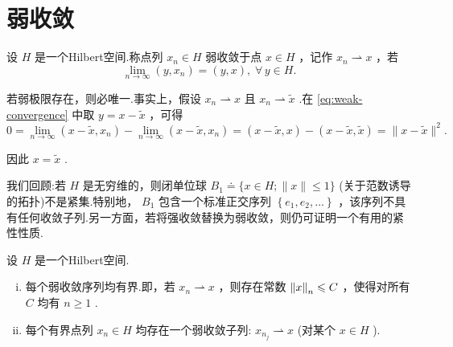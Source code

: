 \section{弱收敛}

\begin{definition}[弱收敛]\label{def:weak-convergence}
设 $H$ 是一个Hilbert空间.称点列 ${x}_{n} \in  H$ 弱收敛于点 $x \in  H$ ，记作 ${x}_{n} \rightharpoonup  x$ ，若
\begin{equation}\tag{5.24}\label{eq:weak-convergence}
\mathop{\lim }\limits_{{n \rightarrow  \infty }}\left( {y,{x}_{n}}\right)  = \left( {y,x}\right), \;\forall\,y \in  H.
\end{equation}
\end{definition}

若弱极限存在，则必唯一.事实上，假设 ${x}_{n} \rightharpoonup  x$ 且 ${x}_{n} \rightharpoonup  \widetilde{x}$ .在 \eqref{eq:weak-convergence} 中取 $y = x - \widetilde{x}$ ，可得
\[
0 = \mathop{\lim }\limits_{{n \rightarrow  \infty }}\left( {x - \widetilde{x},{x}_{n}}\right)  - \mathop{\lim }\limits_{{n \rightarrow  \infty }}\left( {x - \widetilde{x},{x}_{n}}\right)  = \left( {x - \widetilde{x},x}\right)  - \left( {x - \widetilde{x},\widetilde{x}}\right)  = \| x - \widetilde{x}{\| }^{2}.
\]

因此 $x = \widetilde{x}$ .

我们回顾:若 $H$ 是无穷维的，则闭单位球 ${B}_{1} \doteq  \{ x \in  H;\| x\|  \leq  1\}$ (关于范数诱导的拓扑)不是紧集.特别地， ${B}_{1}$ 包含一个标准正交序列 $\left\{  {{e}_{1},{e}_{2},\ldots }\right\}$ ，该序列不具有任何收敛子列.另一方面，若将强收敛替换为弱收敛，则仍可证明一个有用的紧性性质.

\begin{theorem}[弱收敛序列]\label{thm:weak-convergence-sequence}
设 $H$ 是一个Hilbert空间.
\begin{enumerate}[(i)]
    \item 每个弱收敛序列均有界.即，若 ${x}_{n} \rightharpoonup  x$ ，则存在常数 $\norm{x}_{n} \leqslant  C$ ，使得对所有 $C$ 均有 $n \geq  1$ .
    \item 每个有界点列 ${x}_{n} \in  H$ 均存在一个弱收敛子列: ${x}_{{n}_{j}} \rightharpoonup  x$ (对某个 $x \in  H$ ).
\end{enumerate}
\end{theorem}

